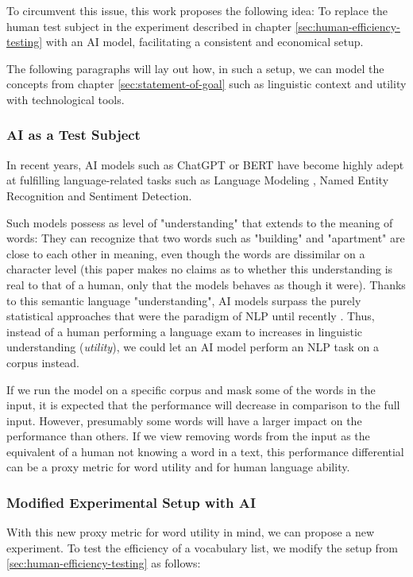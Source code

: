To circumvent this issue, this work proposes the following idea:
To replace the human test subject in the experiment described in chapter \ref{sec:human-efficiency-testing} with an AI model, facilitating a consistent and economical setup.

The following paragraphs will lay out how, in such a setup, we can model the concepts from chapter \ref{sec:statement-of-goal} such as linguistic context and utility with technological tools.

\subsubsection{AI as a Test Subject} \label{sec:ai-as-test-subject}
In recent years, AI models such as ChatGPT  or BERT  have become highly adept at fulfilling language-related tasks such as Language Modeling , Named Entity Recognition and Sentiment Detection.

Such models possess as level of "understanding" that extends to the meaning of words:
They can recognize that two words such as "building" and "apartment" are close to each other in meaning, even though the words are dissimilar on a character level (this paper makes no claims as to whether this understanding is real to that of a human, only that the models behaves as though it were).
Thanks to this semantic language "understanding", AI models surpass the purely statistical approaches that were the paradigm of NLP until recently .
Thus, instead of a human performing a language exam to increases in linguistic understanding (\textit{utility}), we could let an AI model perform an NLP task on a corpus instead.

If we run the model on a specific corpus and mask some of the words in the input, it is expected that the performance will decrease in comparison to the full input.
However, presumably some words will have a larger impact on the performance than others.
If we view removing words from the input as the equivalent of a human not knowing a word in a text, this performance differential can be a proxy metric for word utility and for human language ability.

\subsubsection{Modified Experimental Setup with AI}
With this new proxy metric for word utility in mind, we can propose a new experiment.
To test the efficiency of a vocabulary list, we modify the setup from \ref{sec:human-efficiency-testing} as follows:


